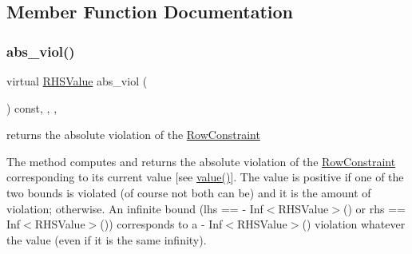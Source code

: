 \subsection{Member Function Documentation}
\mbox{\label{class_s_m_spp__di__unipi__it_1_1_u_b_constraint_a1e06e555eab5078e4d5ec16745778984}} 
\subsubsection{\texorpdfstring{abs\+\_\+viol()}{abs\_viol()}}
{\footnotesize\ttfamily virtual \mbox{\hyperlink{class_s_m_spp__di__unipi__it_1_1_row_constraint_a8813536ab3b13a81c8e83a999ade3bd8}{R\+H\+S\+Value}} abs\+\_\+viol (\begin{DoxyParamCaption}\item[{void}]{ }\end{DoxyParamCaption}) const\hspace{0.3cm}{\ttfamily [inline]}, {\ttfamily [final]}, {\ttfamily [override]}, {\ttfamily [virtual]}}



returns the absolute violation of the \mbox{\hyperlink{class_s_m_spp__di__unipi__it_1_1_row_constraint}{Row\+Constraint}} 

The method computes and returns the absolute violation of the \mbox{\hyperlink{class_s_m_spp__di__unipi__it_1_1_row_constraint}{Row\+Constraint}} corresponding to its current value \mbox{[}see \mbox{\hyperlink{class_s_m_spp__di__unipi__it_1_1_one_var_constraint_ad9256be16b98f3b557f54fa5e2118db7}{value()}}\mbox{]}. The value is positive if one of the two bounds is violated (of course not both can be) and it is the amount of violation; otherwise. An infinite bound (lhs == -\/ Inf$<$\+R\+H\+S\+Value$>$() or rhs == Inf$<$\+R\+H\+S\+Value$>$()) corresponds to a -\/ Inf$<$\+R\+H\+S\+Value$>$() violation whatever the value (even if it is the same infinity).

